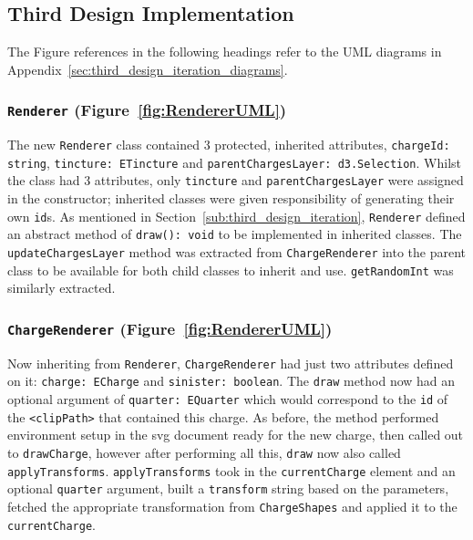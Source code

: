 \documentclass[nobib, a4paper, twoside, justified]{tufte-book}
\makeatletter
\newcommand{\svg}{\gls{svg}\@\xspace}
\newcommand{\charge}{\gls{charge}\@\xspace}
\makeatother
\begin{document}
\subsection{Third Design Implementation}%
\label{sub:third_design_implementation}

The Figure references in the following headings refer to the UML diagrams in
Appendix~\ref{sec:third_design_iteration_diagrams}.

\subsubsection{\texttt{Renderer} (Figure~\ref{fig:RendererUML})}%
\label{ssub:renderer}

The new \texttt{Renderer} class contained 3 protected, inherited attributes, \texttt{chargeId:
string}, \texttt{tincture: ETincture} and \texttt{parentChargesLayer: d3.Selection}. Whilst the
class had 3 attributes, only \texttt{tincture} and \texttt{parentChargesLayer} were assigned in the
constructor; inherited classes were given responsibility of generating their own \texttt{id}s. As
mentioned in Section~\ref{sub:third_design_iteration}, \texttt{Renderer} defined an abstract method
of \texttt{draw(): void} to be implemented in inherited classes. The \texttt{updateChargesLayer}
method was extracted from \texttt{ChargeRenderer} into the parent class to be available for both
child classes to inherit and use. \texttt{getRandomInt} was similarly extracted.

\subsubsection{\texttt{ChargeRenderer} (Figure~\ref{fig:RendererUML})}%
\label{ssub:chargerenderer}

Now inheriting from \texttt{Renderer}, \texttt{ChargeRenderer} had just two attributes defined on
it: \texttt{charge: ECharge} and \texttt{sinister: boolean}. The \texttt{draw} method now had an
optional argument of \texttt{quarter: EQuarter} which would correspond to the \texttt{id} of the
\texttt{<clipPath>} that contained this \charge. As before, the method performed environment setup
in the \svg document ready for the new \charge, then called out to \texttt{drawCharge}, however
after performing all this, \texttt{draw} now also called \texttt{applyTransforms}.
\texttt{applyTransforms} took in the \texttt{currentCharge} element and an optional
\texttt{quarter} argument, built a \texttt{transform} string based on the parameters, fetched the
appropriate transformation from \texttt{ChargeShapes} and applied it to the \texttt{currentCharge}.
\end{document}
